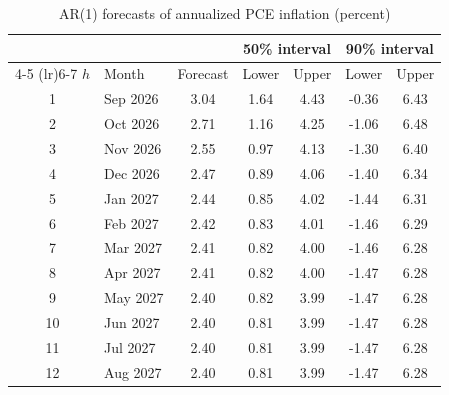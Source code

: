 \begin{table}[htbp]
\centering
\caption{AR(1) forecasts of annualized PCE inflation (percent)}
\label{tab:forecast}
\begin{tabular}{clccccc}
\toprule
 & & & \multicolumn{2}{c}{50\% interval} & \multicolumn{2}{c}{90\% interval} \\
\cmidrule(lr){4-5} \cmidrule(lr){6-7}
$h$ & Month & Forecast & Lower & Upper & Lower & Upper \\
\midrule
1 & Sep 2026 & 3.04 & 1.64 & 4.43 & -0.36 & 6.43 \\
2 & Oct 2026 & 2.71 & 1.16 & 4.25 & -1.06 & 6.48 \\
3 & Nov 2026 & 2.55 & 0.97 & 4.13 & -1.30 & 6.40 \\
4 & Dec 2026 & 2.47 & 0.89 & 4.06 & -1.40 & 6.34 \\
5 & Jan 2027 & 2.44 & 0.85 & 4.02 & -1.44 & 6.31 \\
6 & Feb 2027 & 2.42 & 0.83 & 4.01 & -1.46 & 6.29 \\
7 & Mar 2027 & 2.41 & 0.82 & 4.00 & -1.46 & 6.28 \\
8 & Apr 2027 & 2.41 & 0.82 & 4.00 & -1.47 & 6.28 \\
9 & May 2027 & 2.40 & 0.82 & 3.99 & -1.47 & 6.28 \\
10 & Jun 2027 & 2.40 & 0.81 & 3.99 & -1.47 & 6.28 \\
11 & Jul 2027 & 2.40 & 0.81 & 3.99 & -1.47 & 6.28 \\
12 & Aug 2027 & 2.40 & 0.81 & 3.99 & -1.47 & 6.28 \\
\bottomrule
\end{tabular}
\end{table}